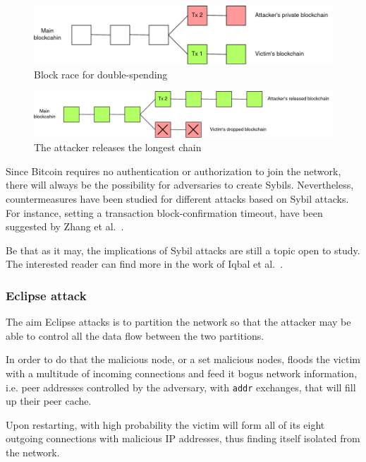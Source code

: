\documentclass[12pt, letterpaper, twoside]{article}
\begin{document}
\begin{figure}[h!]
	\includegraphics[width=.9\textwidth]{pict/blockrace1.png}
	\centering
	\caption{Block race for double-spending}
	\label{fig:race1}
\end{figure}

\begin{figure}[h!]
	\includegraphics[width=.9\textwidth]{pict/blockrace2.png}
	\centering
	\caption{The attacker releases the longest chain}
	\label{fig:race2}
\end{figure}

Since Bitcoin requires no authentication or authorization to join the network, there will always be the possibility for adversaries to create Sybils. Nevertheless, countermeasures have been studied for different attacks based on Sybil attacks. For instance, setting a transaction block-confirmation timeout, have been suggested by Zhang et al.~\cite{zhang-sybil-mitigations}.

Be that as it may, the implications of Sybil attacks are still a topic open to study. The interested reader can find more in the work of Iqbal et al.~\cite{iqbal-sybil}.

\subsubsection{Eclipse attack}\label{sec:eclipse}
The aim Eclipse attacks is to partition the network so that the attacker may be able to control all the data flow between the two partitions.

In order to do that the malicious node, or a set malicious nodes, floods the victim with a multitude of incoming connections and feed it bogus network information, i.e. peer addresses controlled by the adversary, with \texttt{addr} exchanges, that will fill up their peer cache.

Upon restarting, with high probability the victim will form all of its eight outgoing connections with malicious IP addresses, thus finding itself isolated from the network.
\end{document}
